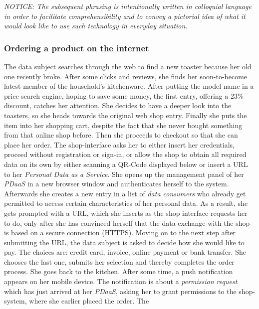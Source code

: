 \documentclass[12pt,english,a4paper,titlepage,cleardoublepage=empty,dottedtoc]{report}
\begin{document}
\emph{NOTICE: The subsequent phrasing is intentionally written in
colloquial language in order to facilitate comprehensibility and to
convey a pictorial idea of what it would look like to use such
technology in everyday situation.}

\subsubsection*{Ordering a product on the
internet}\label{ordering-a-product-on-the-internet}

The data subject searches through the web to find a new toaster because
her old one recently broke. After some clicks and reviews, she finds her
soon-to-become latest member of the household's kitchenware. After
putting the model name in a price search engine, hoping to save some
money, the first entry, offering a 23\% discount, catches her attention.
She decides to have a deeper look into the toasters, so she heads
towards the original web shop entry. Finally she puts the item into her
shopping cart, despite the fact that she never bought something from
that online shop before. Then she proceeds to checkout so that she can
place her order. The shop-interface asks her to either insert her
credentials, proceed without registration or sign-in, or allow the shop
to obtain all required data on its own by either scanning a QR-Code
displayed below or insert a URL to her \emph{Personal Data as a
Service}. She opens up the management panel of her \emph{PDaaS} in a new
browser window and authenticates herself to the system. Afterwards she
creates a new entry in a list of \emph{data consumers} who already get
permitted to access certain characteristics of her personal data. As a
result, she gets prompted with a URL, which she inserts as the shop
interface requests her to do, only after she has convinced herself that
the data exchange with the shop is based on a secure connection (HTTPS).
Moving on to the next step after submitting the URL, the data subject is
asked to decide how she would like to pay. The choices are: credit card,
invoice, online payment or bank transfer. She chooses the last one,
submits her selection and thereby completes the order process. She goes
back to the kitchen. After some time, a push notification appears on her
mobile device. The notification is about a \emph{permission request}
which has just arrived at her \emph{PDaaS}, asking her to grant
permissions to the shop-system, where she earlier placed the order. The
\end{document}
